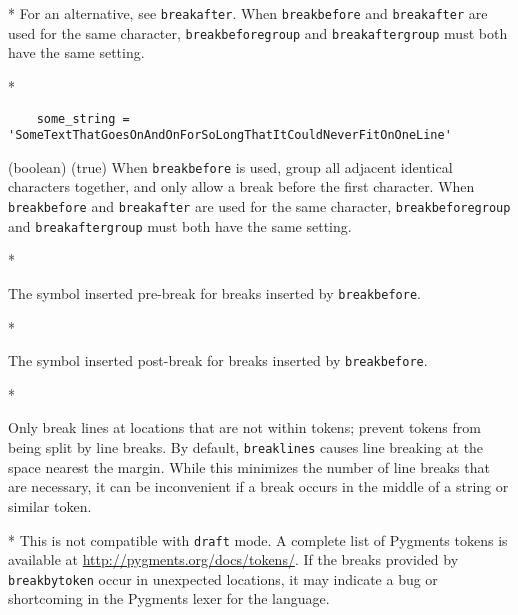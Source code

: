 \begin{paracol}{2}
\begin{optionlist}
\switchcolumn[0]*%
 For an alternative, see \texttt{breakafter}.  When \texttt{breakbefore} and \texttt{breakafter} are used for the same character, \texttt{breakbeforegroup} and \texttt{breakaftergroup} must both have the same setting.
 \switchcolumn

 \switchcolumn[0]*%
\begin{longexample}
    \begin{verbatim}
    some_string = 'SomeTextThatGoesOnAndOnForSoLongThatItCouldNeverFitOnOneLine'
    \end{verbatim}
\end{longexample}

  \item[breakbeforegroup] (boolean) (true)
    When \texttt{breakbefore} is used, group all adjacent identical characters together, and only allow a break before the first character.  When \texttt{breakbefore} and \texttt{breakafter} are used for the same character, \texttt{breakbeforegroup} and \texttt{breakaftergroup} must both have the same setting.
    \switchcolumn

    \switchcolumn[0]*%
  \item[breakbeforesymbolpre (string) (\string\,\string\footnotesize\string\ensuremath\{\_\string\rfloor\}, \,\footnotesize\ensuremath{_\rfloor})]
    The symbol inserted pre-break for breaks inserted by \texttt{breakbefore}.
    \switchcolumn

    \switchcolumn[0]*%
  \item[breakbeforesymbolpost (string) (\meta{none})]
    The symbol inserted post-break for breaks inserted by \texttt{breakbefore}.
    \switchcolumn

    \switchcolumn[0]*%
  \item[breakbytoken (boolean) (false)]
  Only break lines at locations that are not within tokens; prevent tokens from being split by line breaks.  By default, \texttt{breaklines} causes line breaking at the space nearest the margin.  While this minimizes the number of line breaks that are necessary, it can be inconvenient if a break occurs in the middle of a string or similar token.
  \switchcolumn

  \switchcolumn[0]*%
  This is not compatible with \texttt{draft} mode.  A complete list of Pygments tokens is available at \url{http://pygments.org/docs/tokens/}.  If the breaks provided by \texttt{breakbytoken} occur in unexpected locations, it may indicate a bug or shortcoming in the Pygments lexer for the language.
  \switchcolumn


\end{optionlist}
\end{paracol}
